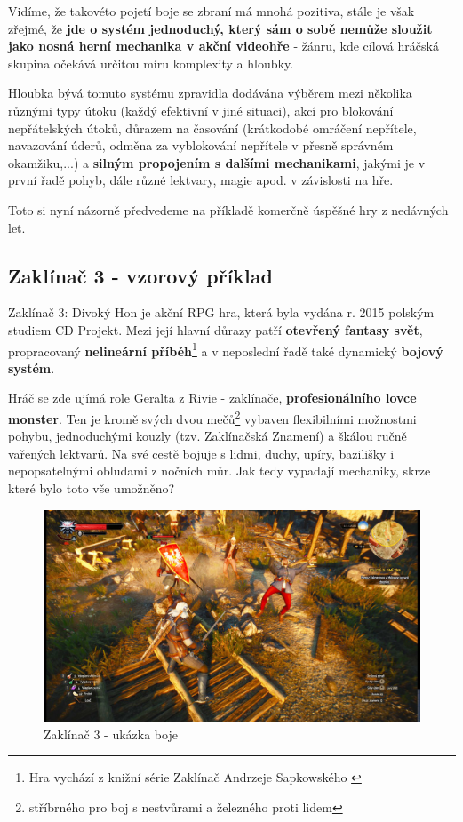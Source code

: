 Vidíme, že takovéto pojetí boje se zbraní má mnohá pozitiva, stále je však zřejmé, že \textbf{jde o systém jednoduchý, který sám o sobě nemůže sloužit jako nosná herní mechanika v akční videohře} - žánru, kde cílová hráčská skupina očekává určitou míru komplexity a hloubky.

Hloubka bývá tomuto systému zpravidla dodávána výběrem mezi několika různými typy útoku (každý efektivní v jiné situaci), akcí pro blokování nepřátelských útoků, důrazem na časování (krátkodobé omráčení nepřítele, navazování úderů, odměna za vyblokování nepřítele v přesně správném okamžiku,...) a \textbf{silným propojením s dalšími mechanikami}, jakými je v první řadě pohyb, dále různé lektvary, magie apod. v závislosti na hře.

Toto si nyní názorně předvedeme na příkladě komerčně úspěšné hry z nedávných let.

\subsection{Zaklínač 3 - vzorový příklad}
Zaklínač 3: Divoký Hon \cite{Wiedzmin3} je akční \acs{RPG} hra, která byla vydána r. 2015 polským studiem CD Projekt. Mezi její hlavní důrazy patří \textbf{otevřený fantasy svět}, propracovaný \textbf{nelineární příběh}\footnote{Hra vychází z knižní série Zaklínač Andrzeje Sapkowského \cite{SapkowskiZaklinac}} a v neposlední řadě také dynamický \textbf{bojový systém}.

Hráč se zde ujímá role Geralta z Rivie - zaklínače, \textbf{profesionálního lovce monster}. Ten je kromě svých dvou mečů\footnote{stříbrného pro boj s nestvůrami a železného proti lidem} vybaven flexibilními možnostmi pohybu, jednoduchými kouzly (tzv. Zaklínačská Znamení) a škálou ručně vařených lektvarů. Na své cestě bojuje s lidmi, duchy, upíry, bazilišky i nepopsatelnými obludami z nočních můr.
Jak tedy vypadají mechaniky, skrze které bylo toto vše umožněno?

\begin{figure}[ht]\centering
    \center
    \includegraphics[width=140mm]{../img/Wiedzmin-combat.jpg}
    \caption{Zaklínač 3 - ukázka boje}
    \label{obr01:wiedzmin}
\end{figure} 


